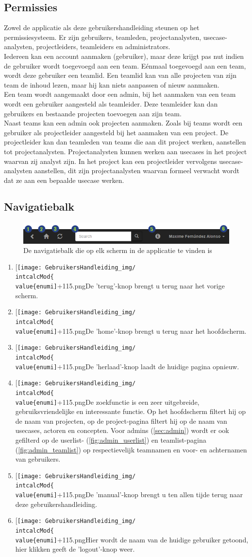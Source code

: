 \documentclass[a4paper,11pt]{article}
\newcommand*{\myitem}{
 \item[{\texttt{[image: GebruikersHandleiding\_img/\\intcalcMod\{\\value\{enumi]}+1}{15}.png}}]\stepcounter{enumi}
\begin{document}
\subsection{Permissies}
\label{subsec:permissions}
Zowel de applicatie als deze gebruikershandleiding steunen op het permissiesysteem. Er zijn gebruikers, teamleden, projectanalysten, usecase-analysten, projectleiders, teamleiders en administrators.\\
Iedereen kan een account aanmaken (gebruiker), maar deze krijgt pas nut indien de gebruiker wordt toegevoegd aan een team. E\'enmaal toegevoegd aan een team, wordt deze gebruiker een teamlid. Een teamlid kan van alle projecten van zijn team de inhoud lezen, maar hij kan niets aanpassen of nieuw aanmaken.\\
Een team wordt aangemaakt door een admin, bij het aanmaken van een team wordt een gebruiker aangesteld als teamleider. Deze teamleider kan dan gebruikers en bestaande projecten toevoegen aan zijn team.\\
Naast teams kan een admin ook projecten aanmaken. Zoals bij teams wordt een gebruiker als projectleider aangesteld bij het aanmaken van een project. De projectleider kan dan teamleden van teams die aan dit project werken, aanstellen tot projectanalysten. Projectanalysten kunnen werken aan usecases in het project waarvan zij analyst zijn. In het project kan een projectleider vervolgens usecase-analysten aanstellen, dit zijn projectanalysten waarvan formeel verwacht wordt dat ze aan een bepaalde usecase werken.

\subsection{Navigatiebalk}
\begin{figure}[H]
\centering
\includegraphics[scale=0.5]{Gebruikershandleiding_img/navbar.png}
\caption{De navigatiebalk die op elk scherm in de applicatie te vinden is}
\label{fig:navbar}
\end{figure}

\begin{enumerate}
\myitem De 'terug'-knop brengt u terug naar het vorige scherm.
\myitem De 'home'-knop brengt u terug naar het hoofdscherm.
\myitem De 'herlaad'-knop laadt de huidige pagina opnieuw.
\myitem De zoekfunctie is een zeer uitgebreide, gebruiksvriendelijke en interessante functie. Op het hoofdscherm filtert hij op de naam van projecten, op de project-pagina filtert hij op de naam van usecases, actoren en concepten. Voor admins (\autoref{sec:admin}) wordt er ook gefilterd op de userlist- (\autoref{fig:admin_userlist}) en teamlist-pagina (\autoref{fig:admin_teamlist}) op respectievelijk teamnamen en voor- en achternamen van gebruikers.
\myitem De 'manual'-knop brengt u ten allen tijde terug naar deze gebruikershandleiding.
\myitem Hier wordt de naam van de huidige gebruiker getoond, hier klikken geeft de 'logout'-knop weer.
\end{enumerate}
\end{document}
